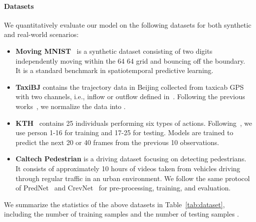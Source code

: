 \documentclass[10pt,twocolumn,letterpaper]{article}
\begin{document}
\paragraph{Datasets} We quantitatively evaluate our model on the following datasets for both synthetic and real-world scenarios: 
\begin{itemize}
  \item \textbf{Moving MNIST}~\cite{srivastava2015unsupervised} is a synthetic dataset consisting of two digits independently moving within the 64  64 grid and bouncing off the boundary. It is a standard benchmark in spatiotemporal predictive learning.
  \item \textbf{TaxiBJ} contains the trajectory data in Beijing collected from taxicab GPS with two channels, i.e., inflow or outflow defined in~\cite{zhang2017deep}. Following the previous works~\cite{mim,phydnet}, we normalize the data into .
  \item \textbf{KTH}~\cite{schuldt2004recognizing} contains 25 individuals performing six types of actions. Following~\cite{villegas2017decomposing,e3dlstm}, we use person 1-16 for training and 17-25 for testing. Models are trained to predict the next 20 or 40 frames from the previous 10 observations.
  \item \textbf{Caltech Pedestrian} is a driving dataset focusing on detecting pedestrians. It consists of approximately 10 hours of  videos taken from vehicles driving through regular traffic in an urban environment. We follow the same protocol of PredNet~\cite{prednet} and CrevNet~\cite{crevnet} for pre-processing, training, and evaluation.
\end{itemize}
We summarize the statistics of the above datasets in Table~\ref{tab:dataset}, including the number of training samples  and the number of testing samples .

\begin{table}[h]
\centering
{}
\end{table}
\end{document}
